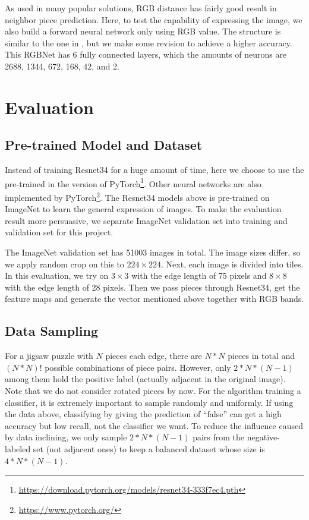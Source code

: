 \documentclass{article}
\begin{document}
As used in many popular solutions, RGB distance has fairly good result in neighbor piece prediction. Here, to test the capability of expressing the image, we also build a forward neural network only using RGB value. The structure is similar to the one in \cite{sholomon2016dnn}, but we make some revision to achieve a higher accuracy. This RGBNet has 6 fully connected layers, which the amounts of neurons are 2688, 1344, 672, 168, 42, and 2.

\section{Evaluation}

\subsection{Pre-trained Model and Dataset}

Instead of training Resnet34 for a huge amount of time, here we choose to use the pre-trained in the version of PyTorch\footnote{\url{https://download.pytorch.org/models/resnet34-333f7ec4.pth}}. Other neural networks are also implemented by PyTorch\footnote{\url{https://www.pytorch.org/}}. The Resnet34 models above is pre-trained on ImageNet\cite{krizhevsky2012imagenet} to learn the general expression of images. To make the evaluation result more persuasive, we separate ImageNet validation set into training and validation set for this project.

The ImageNet validation set has 51003 images in total. The image sizes differ, so we apply random crop on this to $224\times224$. Next, each image is divided into tiles. In this evaluation, we try on $3\times3$ with the edge length of 75 pixels and $8\times8$ with the edge length of 28 pixels. Then we pass pieces through Resnet34, get the feature maps and generate the vector mentioned above together with RGB bands.

\subsection{Data Sampling}

For a jigsaw puzzle with $N$ pieces each edge, there are $N*N$ pieces in total and $(N*N)!$ possible combinations of piece pairs. However, only $2*N*(N-1)$ among them hold the positive label (actually adjacent in the original image). Note that we do not consider rotated pieces by now. For the algorithm training a classifier, it is extremely important to sample randomly and uniformly. If using the data above, classifying by giving the prediction of ``false'' can get a high accuracy but low recall, not the classifier we want. To reduce the influence caused by data inclining, we only sample $2*N*(N-1)$ pairs from the negative-labeled set (not adjacent ones) to keep a balanced dataset whose size is $4*N*(N-1)$.
\end{document}
